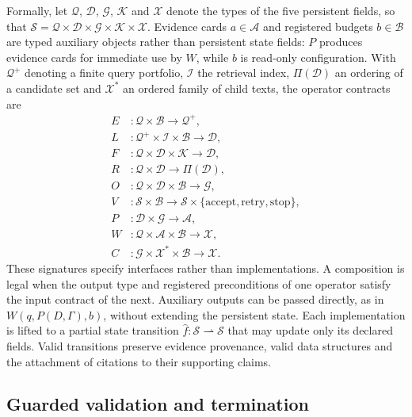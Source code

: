 \documentclass[11pt,a4paper]{article}
\begin{document}
Formally, let $\mathcal{Q}$, $\mathcal{D}$, $\mathcal{G}$, $\mathcal{K}$ and $\mathcal{X}$ denote the types of the five persistent fields, so that $\mathcal{S}=\mathcal{Q}\times\mathcal{D}\times\mathcal{G}\times\mathcal{K}\times\mathcal{X}$. Evidence cards $a\in\mathcal{A}$ and registered budgets $b\in\mathcal{B}$ are typed auxiliary objects rather than persistent state fields: $P$ produces evidence cards for immediate use by $W$, while $b$ is read-only configuration. With $\mathcal{Q}^{+}$ denoting a finite query portfolio, $\mathcal{I}$ the retrieval index, $\Pi(\mathcal{D})$ an ordering of a candidate set and $\mathcal{X}^{*}$ an ordered family of child texts, the operator contracts are
\[
\begin{aligned}
E &: \mathcal{Q}\times\mathcal{B}\rightarrow\mathcal{Q}^{+},\\
L &: \mathcal{Q}^{+}\times\mathcal{I}\times\mathcal{B}\rightarrow\mathcal{D},\\
F &: \mathcal{Q}\times\mathcal{D}\times\mathcal{K}\rightarrow\mathcal{D},\\
R &: \mathcal{Q}\times\mathcal{D}\rightarrow\Pi(\mathcal{D}),\\
O &: \mathcal{Q}\times\mathcal{D}\times\mathcal{B}\rightarrow\mathcal{G},\\
V &: \mathcal{S}\times\mathcal{B}\rightarrow\mathcal{S}\times\{\mathrm{accept},\mathrm{retry},\mathrm{stop}\},\\
P &: \mathcal{D}\times\mathcal{G}\rightarrow\mathcal{A},\\
W &: \mathcal{Q}\times\mathcal{A}\times\mathcal{B}\rightarrow\mathcal{X},\\
C &: \mathcal{G}\times\mathcal{X}^{*}\times\mathcal{B}\rightarrow\mathcal{X}.
\end{aligned}
\]
These signatures specify interfaces rather than implementations. A composition is legal when the output type and registered preconditions of one operator satisfy the input contract of the next. Auxiliary outputs can be passed directly, as in $W(q,P(D,\Gamma),b)$, without extending the persistent state. Each implementation is lifted to a partial state transition $\widehat{f}:\mathcal{S}\rightharpoonup\mathcal{S}$ that may update only its declared fields. Valid transitions preserve evidence provenance, valid data structures and the attachment of citations to their supporting claims.

\subsection*{Guarded validation and termination}
\end{document}
